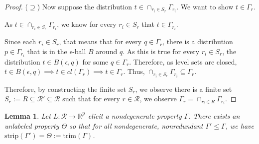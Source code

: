 \documentclass[12pt]{article}
\newcommand{\reals}{\mathbb{R}}
\newcommand{\R}{\mathcal{R}}
\newcommand{\Y}{\mathcal{Y}}
\newcommand{\strip}{\mathrm{strip}}
\newtheorem{lemma}{Lemma}
\begin{document}
\begin{proof}
\bigskip 
($\supseteq$)  Now suppose the distribution $t \in \cap_{r_i \in S_r}\Gamma_{r_i}$.
We want to show $t \in \Gamma_r$.

As $t \in \cap_{r_i \in S_r}\Gamma_{r_i}$, we know for every $r_i \in S_r$ that $t \in \Gamma_{r_i}$.

Since each $r_i \in S_r$, that means that for every $q \in \Gamma_r$, there is a distribution $p \in \Gamma_{r_i}$ that is in the $\epsilon$-ball $B$ around $q$.
As this is true for every $r_i \in S_r$, the distribution $t \in B(\epsilon, q)$ for some $q \in \Gamma_r$. 
Therefore, as level sets are closed, $t \in B(\epsilon, q) \implies t \in cl(\Gamma_r) \implies t \in \Gamma_r$.
Thus, $\cap_{r_i \in S_r}\Gamma_{r_i} \subseteq \Gamma_r$.

Therefore, by constructing the finite set $S_r$, we observe there is a finite set $S_r := R \subseteq \R' \subseteq \R$ such that for every $r \in \R$, we observe $\Gamma_r = \cap_{r_i \in R}\Gamma_{r_i}$.

\end{proof}


\begin{lemma}\label{lem:define-trim}
	Let $L: \R \to \reals^\Y$ elicit a nondegenerate property $\Gamma$.
	There exists an unlabeled property $\Theta$ so that for all nondegenerate, nonredundant $\Gamma' \leq \Gamma$, we have $\strip(\Gamma') = \Theta := \text{trim}(\Gamma)$.
\end{lemma}
\end{document}
